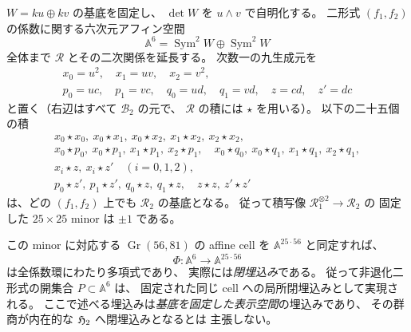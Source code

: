 \begin{proposition}
\label{prop:noncubic-grassmann-explicit-cell}
$W=ku\oplus kv$ の基底を固定し、
$\det W$ を $u\wedge v$ で自明化する。
二形式 $(f_1,f_2)$ の係数に関する六次元アフィン空間
\[
 \mathbb A^6=\operatorname{Sym}^2W\oplus\operatorname{Sym}^2W
\]
全体まで $\mathcal R$ とその二次関係を延長する。
次数一の九生成元を
\[
 \begin{gathered}
 x_0=u^2,\quad x_1=uv,\quad x_2=v^2,\\
 p_0=uc,\quad p_1=vc,\quad q_0=ud,\quad q_1=vd,\quad z=cd,\quad z'=dc
 \end{gathered}
 \tag{NC-9}\label{eq:noncubic-nine-generators}
\]
と置く（右辺はすべて $\mathcal B_2$ の元で、
$\mathcal R$ の積には $\star$ を用いる）。
以下の二十五個の積
\[
\begin{gathered}
 x_0\star x_0,\ x_0\star x_1,\ x_0\star x_2,\
 x_1\star x_2,\ x_2\star x_2,\\
 x_0\star p_0,\ x_0\star p_1,\
 x_1\star p_1,\ x_2\star p_1,\quad
 x_0\star q_0,\ x_0\star q_1,\
 x_1\star q_1,\ x_2\star q_1,\\
 x_i\star z,\ x_i\star z'\quad(i=0,1,2),\\
 p_0\star z',\ p_1\star z',\
 q_0\star z,\ q_1\star z,\quad
 z\star z,\ z'\star z'
\end{gathered}
\tag{NC-25}\label{eq:noncubic-25-pivots}
\]
は、どの $(f_1,f_2)$ 上でも $\mathcal R_2$ の基底となる。
従って積写像 $\mathcal R_1^{\otimes2}\to\mathcal R_2$ の
固定した $25\times25$ minor は $\pm1$ である。

この minor に対応する
$\operatorname{Gr}(56,81)$ の affine cell を
$\mathbb A^{25\cdot56}$ と同定すれば、
\[
 \Phi:\mathbb A^6\longrightarrow\mathbb A^{25\cdot56}
 \tag{NC-cell}\label{eq:noncubic-cell-map}
\]
は全係数環にわたり多項式であり、
実際には\emph{閉埋込み}である。
従って非退化二形式の開集合 $P\subset\mathbb A^6$ は、
固定された同じ cell への局所閉埋込みとして実現される。
ここで述べる埋込みは\emph{基底を固定した表示空間}の埋込みであり、
その群商が内在的な $\mathfrak H_2$ へ閉埋込みとなるとは
主張しない。
\end{proposition}
